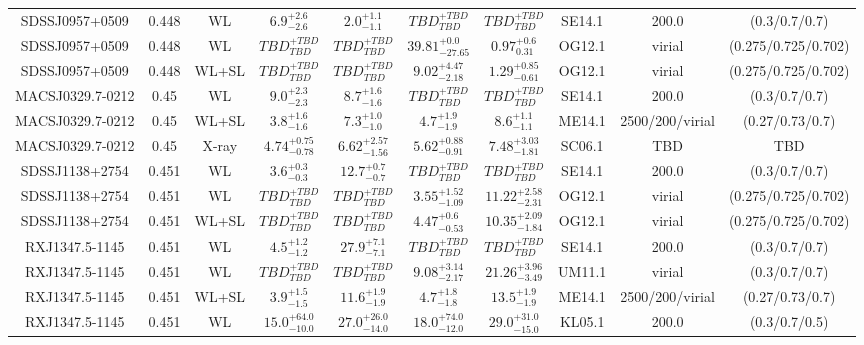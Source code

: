 \begin{table}
\begin{tabular}{cccccccccc}
SDSSJ0957+0509 & 0.448 & WL & ${6.9}^{+2.6}_{-2.6}$ & ${2.0}^{+1.1}_{-1.1}$ & ${TBD}^{+TBD}_{TBD}$ & ${TBD}^{+TBD}_{TBD}$ & SE14.1 & 200.0 & (0.3/0.7/0.7) \\
SDSSJ0957+0509 & 0.448 & WL & ${TBD}^{+TBD}_{TBD}$ & ${TBD}^{+TBD}_{TBD}$ & ${39.81}^{+0.0}_{-27.65}$ & ${0.97}^{+0.6}_{0.31}$ & OG12.1 & virial & (0.275/0.725/0.702) \\
SDSSJ0957+0509 & 0.448 & WL+SL & ${TBD}^{+TBD}_{TBD}$ & ${TBD}^{+TBD}_{TBD}$ & ${9.02}^{+4.47}_{-2.18}$ & ${1.29}^{+0.85}_{-0.61}$ & OG12.1 & virial & (0.275/0.725/0.702) \\
MACSJ0329.7-0212 & 0.45 & WL & ${9.0}^{+2.3}_{-2.3}$ & ${8.7}^{+1.6}_{-1.6}$ & ${TBD}^{+TBD}_{TBD}$ & ${TBD}^{+TBD}_{TBD}$ & SE14.1 & 200.0 & (0.3/0.7/0.7) \\
MACSJ0329.7-0212 & 0.45 & WL+SL & ${3.8}^{+1.6}_{-1.6}$ & ${7.3}^{+1.0}_{-1.0}$ & ${4.7}^{+1.9}_{-1.9}$ & ${8.6}^{+1.1}_{-1.1}$ & ME14.1 & 2500/200/virial & (0.27/0.73/0.7) \\
MACSJ0329.7-0212 & 0.45 & X-ray & ${4.74}^{+0.75}_{-0.78}$ & ${6.62}^{+2.57}_{-1.56}$ & ${5.62}^{+0.88}_{-0.91}$ & ${7.48}^{+3.03}_{-1.81}$ & SC06.1 & TBD & TBD \\
SDSSJ1138+2754 & 0.451 & WL & ${3.6}^{+0.3}_{-0.3}$ & ${12.7}^{+0.7}_{-0.7}$ & ${TBD}^{+TBD}_{TBD}$ & ${TBD}^{+TBD}_{TBD}$ & SE14.1 & 200.0 & (0.3/0.7/0.7) \\
SDSSJ1138+2754 & 0.451 & WL & ${TBD}^{+TBD}_{TBD}$ & ${TBD}^{+TBD}_{TBD}$ & ${3.55}^{+1.52}_{-1.09}$ & ${11.22}^{+2.58}_{-2.31}$ & OG12.1 & virial & (0.275/0.725/0.702) \\
SDSSJ1138+2754 & 0.451 & WL+SL & ${TBD}^{+TBD}_{TBD}$ & ${TBD}^{+TBD}_{TBD}$ & ${4.47}^{+0.6}_{-0.53}$ & ${10.35}^{+2.09}_{-1.84}$ & OG12.1 & virial & (0.275/0.725/0.702) \\
RXJ1347.5-1145 & 0.451 & WL & ${4.5}^{+1.2}_{-1.2}$ & ${27.9}^{+7.1}_{-7.1}$ & ${TBD}^{+TBD}_{TBD}$ & ${TBD}^{+TBD}_{TBD}$ & SE14.1 & 200.0 & (0.3/0.7/0.7) \\
RXJ1347.5-1145 & 0.451 & WL & ${TBD}^{+TBD}_{TBD}$ & ${TBD}^{+TBD}_{TBD}$ & ${9.08}^{+3.14}_{-2.17}$ & ${21.26}^{+3.96}_{-3.49}$ & UM11.1 & virial & (0.3/0.7/0.7) \\
RXJ1347.5-1145 & 0.451 & WL+SL & ${3.9}^{+1.5}_{-1.5}$ & ${11.6}^{+1.9}_{-1.9}$ & ${4.7}^{+1.8}_{-1.8}$ & ${13.5}^{+1.9}_{-1.9}$ & ME14.1 & 2500/200/virial & (0.27/0.73/0.7) \\
RXJ1347.5-1145 & 0.451 & WL & ${15.0}^{+64.0}_{-10.0}$ & ${27.0}^{+26.0}_{-14.0}$ & ${18.0}^{+74.0}_{-12.0}$ & ${29.0}^{+31.0}_{-15.0}$ & KL05.1 & 200.0 & (0.3/0.7/0.5) \\

\end{tabular}
\end{table}
